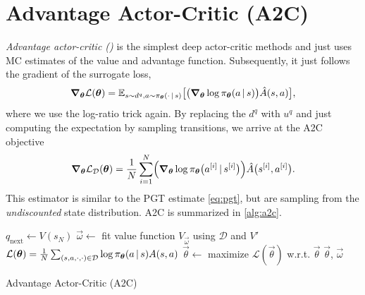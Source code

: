 	\section{Advantage Actor-Critic (\acs{A2C})}
		\emph{Advantage actor-critic ()} is the simplest deep actor-critic methods and just uses \ac{MC} estimates of the value and advantage function. Subsequently, it just follows the gradient of the surrogate loss,
		\begin{equation}
			\grad_{\bm{\theta}} \mathcal{L}(\bm{\theta})
				= \mathbb{E}_{s \sim d^q, a \sim \pi_{\bm{\theta}}(\cdot \,\vert\, s)}\bigl[ \bigl( \grad_{\bm{\theta}} \log \pi_{\bm{\theta}}(a \,\vert\, s) \bigr) \hat{A}(s, a) \bigr],
		\end{equation}
		where we use the log-ratio trick again. By replacing the \(d^q\) with \(u^q\) and just computing the expectation by sampling transitions, we arrive at the \ac{A2C} objective
		\begin{equation}
			\grad_{\bm{\theta}} \mathcal{L}_\mathcal{D}(\bm{\theta}) = \frac{1}{N} \sum_{i = 1}^{N} \Bigl( \grad_{\bm{\theta}} \log \pi_{\bm{\theta}}\bigl(a^{[i]} \,\vert\, s^{[i]}\bigr) \Bigr) \hat{A}\bigl(s^{[i]}, a^{[i]}\bigr).
		\end{equation}
		This estimator is similar to the \ac{PGT} estimate \eqref{eq:pgt}, but are sampling from the \emph{undiscounted} state distribution. \ac{A2C} is summarized in \autoref{alg:a2c}.

		\begin{algorithm}  \DontPrintSemicolon
			 \;
			\( q_\mathrm{next} \gets V(s_N) \) \;
			\( \vec{\omega} \gets \) fit value function \(V_{\vec{\omega}}\) using \(\mathcal{D}\) and \(V'\) \;
			\( \mathcal{L}(\bm{\theta}) = \frac{1}{N} \sum_{(s, a, \cdot, \cdot) \in \mathcal{D}} \log \pi_{\bm{\theta}}(a \,\vert\, s) A(s, a) \) \;
			\( \vec{\theta} \gets \) maximize \(\mathcal{L}(\vec{\theta})\) w.r.t. \(\vec{\theta}\) \;
			\Return \(\vec{\theta}\), \(\vec{\omega}\) \;
			\caption{Advantage Actor-Critic (\acs{A2C})}
			\label{alg:a2c}
		\end{algorithm}

